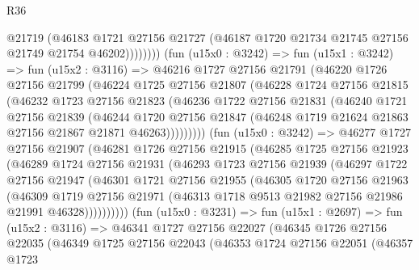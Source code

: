 \begin{lexlean}{R36}
\begin{coremodule}
                    @21719
                    (@46183
                      @1721
                      @27156
                      @21727
                      (@46187 @1720 @21734 @21745 @27156 @21749 @21754 @46202))))))))
        (fun (u15x0 : @3242) =>
        fun (u15x1 : @3242) =>
        fun (u15x2 : @3116) =>
        @46216
          @1727
          @27156
          @21791
          (@46220
            @1726
            @27156
            @21799
            (@46224
              @1725
              @27156
              @21807
              (@46228
                @1724
                @27156
                @21815
                (@46232
                  @1723
                  @27156
                  @21823
                  (@46236
                    @1722
                    @27156
                    @21831
                    (@46240
                      @1721
                      @27156
                      @21839
                      (@46244
                        @1720
                        @27156
                        @21847
                        (@46248 @1719 @21624 @21863 @27156 @21867 @21871 @46263)))))))))
        (fun (u15x0 : @3242) =>
        @46277
          @1727
          @27156
          @21907
          (@46281
            @1726
            @27156
            @21915
            (@46285
              @1725
              @27156
              @21923
              (@46289
                @1724
                @27156
                @21931
                (@46293
                  @1723
                  @27156
                  @21939
                  (@46297
                    @1722
                    @27156
                    @21947
                    (@46301
                      @1721
                      @27156
                      @21955
                      (@46305
                        @1720
                        @27156
                        @21963
                        (@46309
                          @1719
                          @27156
                          @21971
                          (@46313 @1718 @9513 @21982 @27156 @21986 @21991 @46328))))))))))
        (fun (u15x0 : @3231) =>
        fun (u15x1 : @2697) =>
        fun (u15x2 : @3116) =>
        @46341
          @1727
          @27156
          @22027
          (@46345
            @1726
            @27156
            @22035
            (@46349
              @1725
              @27156
              @22043
              (@46353
                @1724
                @27156
                @22051
                (@46357
                  @1723

\end{coremodule}
\end{lexlean}
